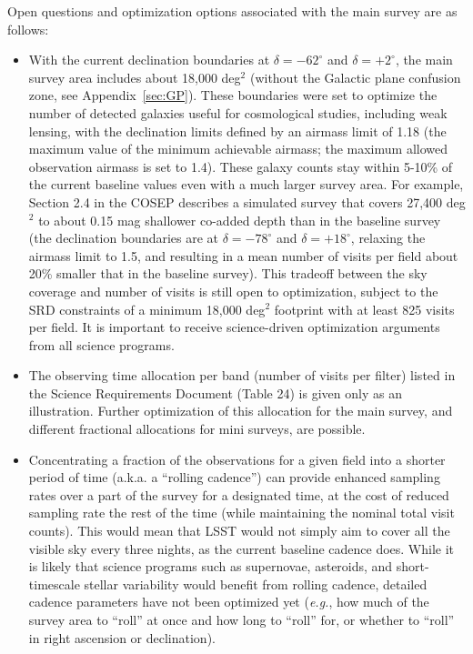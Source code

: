 \documentclass[DM,lsstdraft,toc,usenatbib]{lsstdoc}
\begin{document}
Open questions and optimization options associated with the main survey are as follows: 
\begin{itemize}
\item With the current declination boundaries at $\delta = -62^\circ$ and $\delta = +2^\circ$,
the main survey area includes about 18,000 deg$^2$ (without the Galactic plane 
confusion zone, see Appendix~\ref{sec:GP}). These boundaries were set to optimize the number of
detected galaxies useful for cosmological studies, including weak lensing, with the declination
limits defined by an airmass limit of 1.18 (the maximum value of the minimum achievable airmass;
the maximum allowed observation airmass is set to 1.4). These galaxy counts 
stay within 5-10\% of the current baseline values even with a much larger survey area. 
For example, Section 2.4 in the COSEP describes a simulated survey
that covers 27,400 deg$^2$ to about 0.15 mag shallower co-added depth than in the baseline 
survey (the declination boundaries are at $\delta = -78^\circ$ and $\delta = +18^\circ$, relaxing the 
airmass limit to 1.5, and resulting in a mean number of visits per field about 20\% smaller that
in the baseline survey). This tradeoff between the sky coverage and number of visits is still
open to optimization, subject to the SRD constraints of a minimum 18,000 deg$^2$ footprint with at least 825 
visits per field. It is important to receive science-driven optimization arguments
from all science programs.  
\item The observing time allocation per band (number of visits per filter) listed in the Science Requirements Document
(Table 24) is given only as an illustration. Further optimization of this allocation for the main 
survey, and different fractional allocations for mini surveys, are possible. 
\item Concentrating a fraction of the observations for a given field into a shorter period of time
(a.k.a. a ``rolling cadence'') can provide enhanced
sampling rates over a part of the survey for a designated time, at the
cost of reduced sampling rate the rest of the time (while maintaining the nominal total 
visit counts). This would mean that LSST would not simply aim to cover all the visible sky every three nights,
as the current baseline cadence does. 
While it is likely that science programs such as supernovae, asteroids, and
short-timescale stellar variability would benefit from rolling cadence, detailed cadence
parameters have not been optimized yet ({\it e.g.}, how much of the survey area to ``roll'' at once 
and how long to ``roll'' for, or whether to ``roll'' in right ascension or declination).

\end{itemize}
\end{document}
